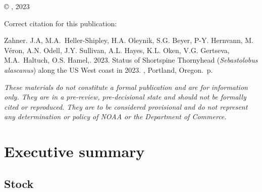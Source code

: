 \documentclass[11pt,
  english,
  letterpaper,
]{article}
\newcommand{\trTitle}{Status of Shortspine Thornyhead (\emph{Sebastolobus alascanus}) along the US West coast in 2023}
\newcommand{\trYear}{2023}
\newcommand{\trAuthsBack}{Zahner. J.A, M.A.~Heller-Shipley, H.A. Oleynik, S.G. Beyer, P-Y. Hernvann, M. Véron, A.N. Odell, J.Y. Sullivan, A.L. Hayes, K.L. Oken, V.G. Gertseva, M.A.~Haltuch, O.S. Hamel,}
\newcommand{\trCitation}{
\begin{hangparas}{1em}{1}
\trAuthsBack{}. \trYear{}. \trTitle{}. \glsentrylong{pfmc}, Portland, Oregon. \pageref{LastPage}{}\,p.
\end{hangparas}}
\begin{document}
\thispagestyle{empty}
\vspace*{\fill}
\begin{center}
\copyright{} , \trYear{}\\
\end{center}
\par
\bigskip
\noindent
Correct citation for this publication:
\bigskip
\par
\trCitation{}
\clearpage


\tableofcontents\clearpage
\label{TRlastRoman}
\clearpage

\newpage
\thispagestyle{empty} %

\pagestyle{plain}  %
\renewcommand*{\thefootnote}{\arabic{footnote}}  %
\setcounter{footnote}{0}  %
\renewcommand{\headrulewidth}{0.5pt}
\renewcommand{\footrulewidth}{0.5pt}

\newcommand{\lt}{\ensuremath <}
\newcommand{\gt}{\ensuremath >}

\emph{These materials do not constitute a formal publication and are for information only. They are in a pre-review, pre-decisional state and should not be formally cited or reproduced. They are to be considered provisional and do not represent any determination or policy of NOAA or the Department of Commerce.}

\pagebreak
{}
\setcounter{page}{1}

\renewcommand{\thetable}{\roman{table}}
\renewcommand{\thefigure}{\roman{figure}}

\setlength\parskip{0.5em plus 0.1em minus 0.2em}

\hypertarget{executive-summary}{%
\section*{Executive summary}\label{executive-summary}}

\hypertarget{stock}{%
\subsection*{Stock}\label{stock}}
\end{document}
